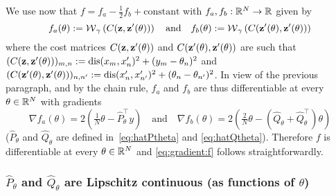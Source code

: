 We  use now  that  $f  = f_{a}  -  \tfrac{1}{2}f_{b}  + \text{constant}$  with
$f_{a},f_{b} : \mathbb{R}^{N} \to \mathbb{R}$ given by
\begin{equation*}
  f_{a}(\theta)   :=  \operatorname{\mathcal{W}}_{\gamma}   \left(C(\textbf{z},\textbf{z}'(\theta))\right)  \quad
  \text{and}        \quad        f_{b}(\theta)        :=        \operatorname{\mathcal{W}}_{\gamma}
  \left(C(\textbf{z}'(\theta),\textbf{z}'(\theta))\right) 
\end{equation*}
where       the       cost      matrices       $C(\textbf{z},\textbf{z}'(\theta))$       and
$C(\textbf{z}'(\theta),\textbf{z}'(\theta))$            are             such            that
$(C(\textbf{z},\textbf{z}'(\theta)))_{m,n}   :=   \operatorname{dis}(x_{m},   x_{n}')^{2}   +   (y_{m}   -
\theta_{n})^{2}$                                                           and
$(C(\textbf{z}'(\theta),\textbf{z}'(\theta)))_{n,n'}   :=    \operatorname{dis}(x_{n}',   x_{n'}')^{2}   +
(\theta_{n} -  \theta_{n'})^{2}$.  In view  of the previous paragraph,  and by
the  chain  rule,  $f_{a}$  and  $f_{b}$  are  thus  differentiable  at  every
$\theta \in \mathbb{R}^{N}$ with gradients
\begin{equation*}
  \nabla f_{a}(\theta)  = 2 (\tfrac{1}{N}\theta  - \widehat{P}_{\theta}^{\top}
  y) \quad \text{and} \quad 
  \nabla  f_{b}(\theta)  =  2 (\tfrac{2}{N}\theta  -  (\widehat{Q}_{\theta}  +
  \widehat{Q}_{\theta}^{\top}) \theta)
\end{equation*}
($\widehat{P}_{\theta}$     and     $\widehat{Q}_{\theta}$     are     defined
in~\eqref{eq:hatPtheta}   and   \eqref{eq:hatQtheta}).    Therefore   $f$   is
differentiable  at  every  $\theta  \in  \mathbb{R}^{N}$  and  \eqref{eq:gradient:f}
follows straightforwardly.

\subsubsection{ $\widehat{P}_{\theta}$                           and
  $\widehat{Q}_{\theta}$ are Lipschitz  continuous (as functions of
  $\theta$)}
\label{subsec:phat:qhat:lipschitz}

